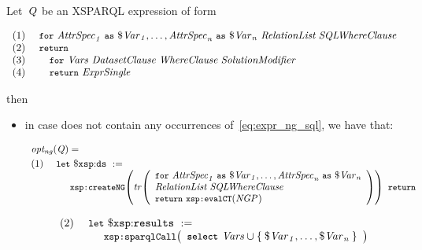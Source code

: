 Let~$\mathit{{Q}_{}}$ be an XSPARQL expression of form
%
\begin{queryF}
\[\begin{array}{l}
  \mathrm{(1)~~~~}\texttt{{\small for}}~\mathit{{AttrSpec}_{1}}~\texttt{{\small as}}~\mathit{{\$\mathit{Var}}_{1}}, \dots, \mathit{{AttrSpec}_{n}}~\texttt{{\small as}}~\mathit{{\$\mathit{Var}}_{n}}~{\textit{RelationList}}~{\textit{SQLWhereClause}}\\
  \mathrm{(2)~~~~}\texttt{{\small return}} \\
  \mathrm{(3)~~~~}\quad\texttt{{\small for}}~\mathit{Vars}~{\textit{Da\-ta\-set\-Clau\-se}}~{\textit{Whe\-re\-Clause}}~{\textit{Solution\-Modifier}}\\
  \mathrm{(4)~~~~}\quad\texttt{{\small return}}~{\textit{Expr\-Single}}
  \end{array}\]
\label{eq:expr_ng_sql}
\end{queryF}%
%
then
%
\begin{itemize}
\item in case \ExprSingle  does not contain any occurrences of~\eqref{eq:expr_ng_sql},
    we have that:
%
\begin{small}
\begin{equation*}
\begin{array}{l}
  \mathit{opt_{ng}}\!\left(\mathit{{Q}_{}}\right) =\\[.3em]
  \mathrm{(1)~~~~}\texttt{{\small let}}~\$\mathtt{xsp{:}ds}~:=\\
  \qquad\qquad\texttt{{\small \texttt{{\small xsp{:}}}createNG}}\!\left(
      \mathit{tr}\!\left(\begin{array}{l}
          \texttt{{\small for}}~\mathit{{AttrSpec}_{1}}~\texttt{{\small as}}~\mathit{{\$\mathit{Var}}_{1}},\dots,\mathit{{AttrSpec}_{n}}~\texttt{{\small as}}~\mathit{{\$\mathit{Var}}_{n}}\\
          {\textit{RelationList}}~{\textit{SQLWhereClause}}\\
          \texttt{{\small return}}~\texttt{{\small \texttt{{\small xsp{:}}}evalCT}}\!\left( \mathit{{NGP}_{}}\right)\\
      \end{array}
    \right)\right)~\texttt{{\small return}}\\
\end{array}
\end{equation*}
\end{small}%
\begin{small}
\begin{equation*}
\begin{array}{l}
    \mathrm{(2)~~~~}\texttt{{\small let}}~\$\mathtt{xsp{:}results}~:=\\
    \qquad\qquad\texttt{{\small \texttt{{\small xsp{:}}}sparqlCall}}\!\left(
                    \begin{array}{l}
                      \texttt{{\small select}}~\mathit{Vars} \cup \left\{\:\mathit{{\$\mathit{Var}}_{1}}, \dots, \mathit{{\$\mathit{Var}}_{n}}\:\right\} \\

\end{array}\right)
\end{array}
\end{equation*}
\end{small}
\end{itemize}
